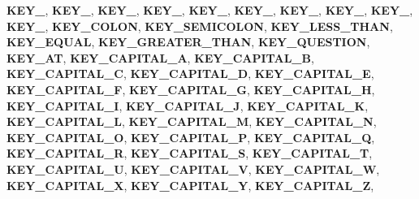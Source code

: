 \begin{DoxyCompactItemize}
\newline
{\bfseries K\+E\+Y\+\_}, 
{\bfseries K\+E\+Y\+\_}, 
{\bfseries K\+E\+Y\+\_}, 
{\bfseries K\+E\+Y\+\_}, 
\newline
{\bfseries K\+E\+Y\+\_}, 
{\bfseries K\+E\+Y\+\_}, 
{\bfseries K\+E\+Y\+\_}, 
{\bfseries K\+E\+Y\+\_}, 
\newline
{\bfseries K\+E\+Y\+\_}, 
{\bfseries K\+E\+Y\+\_}, 
{\bfseries K\+E\+Y\+\_\+\+C\+O\+L\+ON}, 
{\bfseries K\+E\+Y\+\_\+\+S\+E\+M\+I\+C\+O\+L\+ON}, 
\newline
{\bfseries K\+E\+Y\+\_\+\+L\+E\+S\+S\+\_\+\+T\+H\+AN}, 
{\bfseries K\+E\+Y\+\_\+\+E\+Q\+U\+AL}, 
{\bfseries K\+E\+Y\+\_\+\+G\+R\+E\+A\+T\+E\+R\+\_\+\+T\+H\+AN}, 
{\bfseries K\+E\+Y\+\_\+\+Q\+U\+E\+S\+T\+I\+ON}, 
\newline
{\bfseries K\+E\+Y\+\_\+\+AT}, 
{\bfseries K\+E\+Y\+\_\+\+C\+A\+P\+I\+T\+A\+L\+\_\+A}, 
{\bfseries K\+E\+Y\+\_\+\+C\+A\+P\+I\+T\+A\+L\+\_\+B}, 
{\bfseries K\+E\+Y\+\_\+\+C\+A\+P\+I\+T\+A\+L\+\_\+C}, 
\newline
{\bfseries K\+E\+Y\+\_\+\+C\+A\+P\+I\+T\+A\+L\+\_\+D}, 
{\bfseries K\+E\+Y\+\_\+\+C\+A\+P\+I\+T\+A\+L\+\_\+E}, 
{\bfseries K\+E\+Y\+\_\+\+C\+A\+P\+I\+T\+A\+L\+\_\+F}, 
{\bfseries K\+E\+Y\+\_\+\+C\+A\+P\+I\+T\+A\+L\+\_\+G}, 
\newline
{\bfseries K\+E\+Y\+\_\+\+C\+A\+P\+I\+T\+A\+L\+\_\+H}, 
{\bfseries K\+E\+Y\+\_\+\+C\+A\+P\+I\+T\+A\+L\+\_\+I}, 
{\bfseries K\+E\+Y\+\_\+\+C\+A\+P\+I\+T\+A\+L\+\_\+J}, 
{\bfseries K\+E\+Y\+\_\+\+C\+A\+P\+I\+T\+A\+L\+\_\+K}, 
\newline
{\bfseries K\+E\+Y\+\_\+\+C\+A\+P\+I\+T\+A\+L\+\_\+L}, 
{\bfseries K\+E\+Y\+\_\+\+C\+A\+P\+I\+T\+A\+L\+\_\+M}, 
{\bfseries K\+E\+Y\+\_\+\+C\+A\+P\+I\+T\+A\+L\+\_\+N}, 
{\bfseries K\+E\+Y\+\_\+\+C\+A\+P\+I\+T\+A\+L\+\_\+O}, 
\newline
{\bfseries K\+E\+Y\+\_\+\+C\+A\+P\+I\+T\+A\+L\+\_\+P}, 
{\bfseries K\+E\+Y\+\_\+\+C\+A\+P\+I\+T\+A\+L\+\_\+Q}, 
{\bfseries K\+E\+Y\+\_\+\+C\+A\+P\+I\+T\+A\+L\+\_\+R}, 
{\bfseries K\+E\+Y\+\_\+\+C\+A\+P\+I\+T\+A\+L\+\_\+S}, 
\newline
{\bfseries K\+E\+Y\+\_\+\+C\+A\+P\+I\+T\+A\+L\+\_\+T}, 
{\bfseries K\+E\+Y\+\_\+\+C\+A\+P\+I\+T\+A\+L\+\_\+U}, 
{\bfseries K\+E\+Y\+\_\+\+C\+A\+P\+I\+T\+A\+L\+\_\+V}, 
{\bfseries K\+E\+Y\+\_\+\+C\+A\+P\+I\+T\+A\+L\+\_\+W}, 
\newline
{\bfseries K\+E\+Y\+\_\+\+C\+A\+P\+I\+T\+A\+L\+\_\+X}, 
{\bfseries K\+E\+Y\+\_\+\+C\+A\+P\+I\+T\+A\+L\+\_\+Y}, 
{\bfseries K\+E\+Y\+\_\+\+C\+A\+P\+I\+T\+A\+L\+\_\+Z}, 

\end{DoxyCompactItemize}
